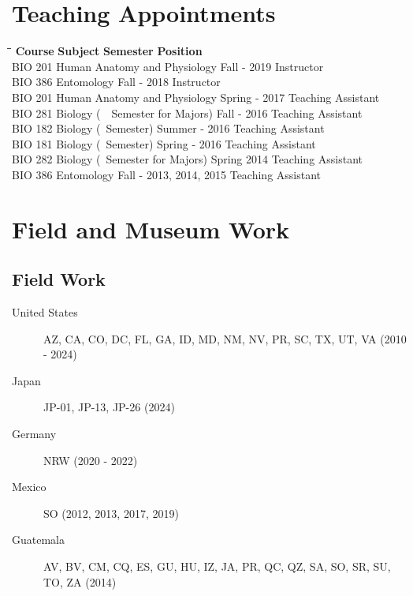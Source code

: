 \documentclass[12pt,a4paper]{article}
\begin{document}
\section*{Teaching Appointments}
\begin{tabbing}
	\hspace{2cm}\=\hspace{6.5cm}\=\hspace{4cm}\=\kill
	\textbf{Course} \> \textbf{Subject} \> \textbf{Semester} \> \textbf{Position}\\
	BIO 201 \> Human Anatomy and Physiology \> Fall - 2019 \> Instructor \\
	BIO 386 \> Entomology \> Fall - 2018 \> Instructor \\ 
	BIO 201 \> Human Anatomy and Physiology \> Spring - 2017 \> Teaching Assistant \\
	BIO 281 \> Biology (~~Semester for Majors) \> Fall - 2016 \> Teaching Assistant \\
	BIO 182 \> Biology (~Semester) \> Summer - 2016 \> Teaching Assistant \\
	BIO 181 \> Biology (~Semester) \> Spring - 2016 \> Teaching Assistant \\
	BIO 282 \> Biology (~Semester for Majors) \> Spring 2014 \> Teaching Assistant \\
	BIO 386 \> Entomology \> Fall - 2013, 2014, 2015 \> Teaching Assistant
\end{tabbing} 

\section*{Field and Museum Work}
\subsection*{Field Work}
\begin{description}
	\item [United States] \tabto*{3cm} AZ, CA, CO, DC, FL, GA, ID, MD, NM, NV, PR, SC, TX, UT, VA (2010 - 2024)
	\item [Japan] \tabto*{3cm} JP-01, JP-13, JP-26 (2024)
	\item [Germany] \tabto*{3cm} NRW (2020 - 2022)
	\item [Mexico] \tabto*{3cm} SO (2012, 2013, 2017, 2019)
	\item [Guatemala] \tabto*{3cm} AV, BV, CM, CQ, ES, GU, HU, IZ, JA, PR, QC, QZ, SA, SO, SR, SU, TO, ZA (2014)
\end{description}
\end{document}
